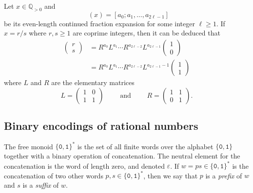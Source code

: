\documentclass[a4paper,12pt]{amsart}
\newcommand{\Q}{\mathbb{Q}}
\newcommand{\0}{\mathtt{0}}
\newcommand{\1}{\mathtt{1}}
\newcommand{\2}{\mathtt{2}}
\newcommand{\3}{\mathtt{3}}
\DeclareMathOperator{\CFeven}{{CF_{\text{even}}}}
\begin{document}
Let $x\in\Q_{>0}$
and \[\CFeven(x)=[a_0;a_1,\dots,a_{2\ell-1}]\] be
its even-length continued fraction expansion
for some integer $\ell\geq1$.
If $x=r/s$ where $r,s\geq1$ are coprime integers,
then it can be deduced \cite[Theorem 149]{MR2445243}
that
\begin{equation}\label{eq:CF-expansion-LR}
    \begin{aligned}
        \left(\begin{array}{c} r \\ s \end{array}\right)
        &=
        R^{a_0}L^{a_1}\cdots R^{a_{2\ell-2}}L^{a_{2\ell-1}}
         \left(\begin{smallmatrix} 1 \\ 0 \end{smallmatrix}\right)\\
        &=
        R^{a_0}L^{a_1}\cdots R^{a_{2\ell-2}}L^{a_{2\ell-1}-1}
         \left(\begin{smallmatrix} 1 \\ 1 \end{smallmatrix}\right)
    \end{aligned}
\end{equation}
where $L$ and $R$ are the elementary matrices
\[
L=
\left(\begin{array}{rr}
1 & 0 \\
1 & 1
\end{array}\right)
\qquad
\text{ and }
\qquad
R=
\left(\begin{array}{rr}
1 & 1 \\
0 & 1
\end{array}\right).
\]

\subsection{Binary encodings of rational numbers}
\label{sec:binary-encoding-of-QQ}

The free monoid $\{\0,\1\}^*$ is the set of all finite words
over the alphabet $\{\0,\1\}$ together with a binary operation
of concatenation. The neutral element for the concatenation is the
word of length zero, and denoted $\varepsilon$. If $w=ps\in\{\0,\1\}^*$
is the concatenation of two other words $p,s\in\{\0,\1\}^*$,
then we say that $p$ is a \emph{prefix} of $w$
and $s$ is a \emph{suffix} of $w$.
\end{document}
